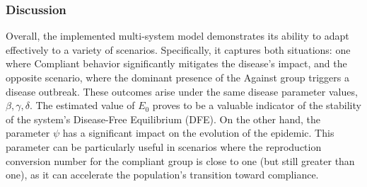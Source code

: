 \subsubsection{Discussion}
Overall, the implemented multi-system model demonstrates its ability to adapt effectively to a variety of scenarios. Specifically, it captures both situations: one where Compliant behavior significantly mitigates the disease's impact, and the opposite scenario, where the dominant presence of the Against group triggers a disease outbreak. These outcomes arise under the same disease parameter values, $\beta, \gamma, \delta$. The estimated value of $E_0$ proves to be a valuable indicator of the stability of the system's Disease-Free Equilibrium (DFE). On the other hand, the parameter $\psi$ has a significant impact on the evolution of the epidemic. This parameter can be particularly useful in scenarios where the reproduction conversion number for the compliant group is close to one (but still greater than one), as it can accelerate the population's transition toward compliance.
